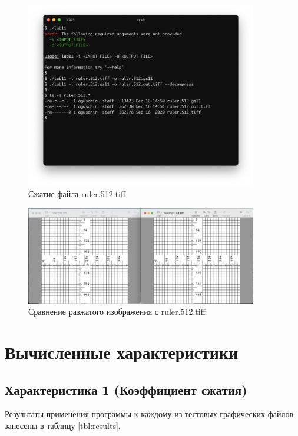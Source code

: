 \documentclass[a4paper,oneside]{article}
\theoremstyle{definition}
\begin{document}
\begin{figure}[H]
  \centering
  \includegraphics[width=0.9\textwidth]{test3.jpg}
  \caption{Сжатие файла ruler.512.tiff}
  \label{fig:test_3}
\end{figure}

\begin{figure}[H]
  \centering
  \includegraphics[width=0.9\textwidth]{test3_img.jpg}
  \caption{Сравнение разжатого изображения с ruler.512.tiff}
  \label{fig:test_3_img}
\end{figure}

\section{Вычисленные характеристики}

\subsection{Характеристика 1 (Коэффициент сжатия)}

Результаты применения программы к каждому из тестовых графических файлов занесены
в таблицу \ref{tbl:results}.
\end{document}
